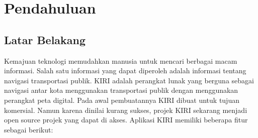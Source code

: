 \chapter{Pendahuluan}
\label{chap:intro}
   
\section{Latar Belakang}
\label{sec:label}

Kemajuan teknologi memudahkan manusia untuk mencari berbagai macam informasi. Salah satu informasi yang dapat diperoleh adalah informasi tentang navigasi transportasi publik. KIRI  adalah perangkat lunak yang berguna sebagai navigasi antar kota menggunakan transportasi publik dengan menggunakan perangkat peta digital\cite{pascal:17:KIRI}. Pada awal pembuatannya KIRI dibuat untuk tujuan komersial. Namun karena dinilai kurang sukses, projek KIRI sekarang menjadi open source projek yang dapat di akses. Aplikasi KIRI memiliki beberapa fitur sebagai berikut:
